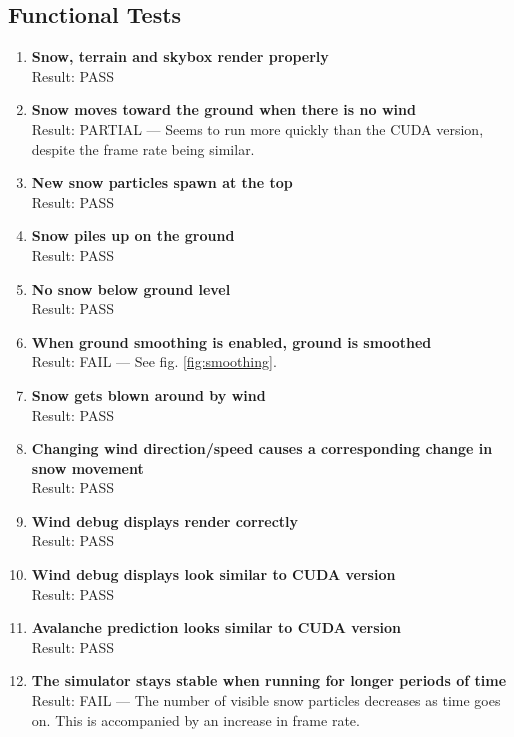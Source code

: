 \subsection{Functional Tests}
\begin{enumerate}
\item \textbf{Snow, terrain and skybox render properly} \\ Result: PASS
\item \textbf{Snow moves toward the ground when there is no wind} \\ Result: PARTIAL --- Seems to run more quickly than the CUDA version, despite the frame rate being similar.
\item \textbf{New snow particles spawn at the top} \\ Result: PASS
\item \textbf{Snow piles up on the ground} \\ Result: PASS
\item \textbf{No snow below ground level} \\ Result: PASS
\item \textbf{When ground smoothing is enabled, ground is smoothed} \\ Result: FAIL --- See fig. \ref{fig:smoothing}.
\item \textbf{Snow gets blown around by wind} \\ Result: PASS
\item \textbf{Changing wind direction/speed causes a corresponding change in snow movement} \\ Result: PASS
\item \textbf{Wind debug displays render correctly} \\ Result: PASS
\item \textbf{Wind debug displays look similar to CUDA version} \\ Result: PASS
\item \textbf{Avalanche prediction looks similar to CUDA version} \\ Result: PASS
\item \textbf{The simulator stays stable when running for longer periods of time} \\ Result: FAIL --- The number of visible snow particles decreases as time goes on. This is accompanied by an increase in frame rate.
\end{enumerate}

